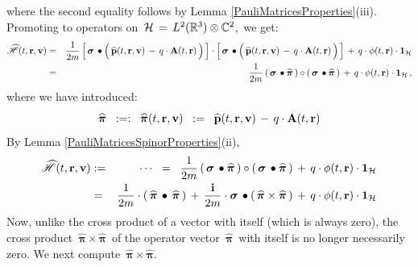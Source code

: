 where the second equality follows by Lemma \ref{PauliMatricesProperties}(iii).
Promoting to operators on \,$\mathcal{H} \,=\, L^{2}(\mathbb{R}^{3}) \otimes \mathbb{C}^{2}$,\, we get:
\begin{eqnarray*}
\widehat{\mathscr{H}}(t, \mathbf{r}, \mathbf{v})
& = &
    \dfrac{1}{2m}
    \left[\,
        \boldsymbol{\sigma}\,\bullet\left(\,
            \widehat{\mathbf{p}}(t,\mathbf{r},\mathbf{v})
            \, \overset{{\color{white}.}}{-} \,
            q\cdot\mathbf{A}(t,\mathbf{r})
            \,\right)
        \,\right]
    \cdot
    \left[\,
        \boldsymbol{\sigma}\,\bullet\left(\,
            \widehat{\mathbf{p}}(t,\mathbf{r},\mathbf{v})
            \, \overset{{\color{white}.}}{-} \,
            q\cdot\mathbf{A}(t,\mathbf{r})
            \,\right)
        \,\right]
    \, + \,
    q\cdot\phi(t,\mathbf{r})\cdot\boldsymbol{1}_{\mathcal{H}}
\\
& = &
    \dfrac{1}{2m}
    \left(\,
        \boldsymbol{\sigma}\,\bullet\boldsymbol{\widehat{\pi}}
        \,\right)
    \circ
    \left(\,
        \boldsymbol{\sigma}\,\bullet\boldsymbol{\widehat{\pi}}
        \,\right)
    \, + \,
    q\cdot\phi(t,\mathbf{r})\cdot\boldsymbol{1}_{\mathcal{H}}\,,
\end{eqnarray*}
where we have introduced:
\begin{equation*}
\boldsymbol{\widehat{\pi}}
\;\; :=: \;\;
    \boldsymbol{\widehat{\pi}}(t, \mathbf{r}, \mathbf{v})
\;\; := \;\;
    \widehat{\mathbf{p}}(t,\mathbf{r},\mathbf{v})
    \, \overset{{\color{white}.}}{-} \,
    q\cdot\mathbf{A}(t,\mathbf{r})
\end{equation*}
By Lemma \ref{PauliMatricesSpinorProperties}(ii),
\begin{eqnarray*}
\widehat{\mathscr{H}}(t, \mathbf{r}, \mathbf{v})
& := &
    \cdots
\;\; = \;\;
    \dfrac{1}{2m}
    \left(\,
        \boldsymbol{\sigma}\,\bullet\boldsymbol{\widehat{\pi}}
        \,\right)
    \circ
    \left(\,
        \boldsymbol{\sigma}\,\bullet\boldsymbol{\widehat{\pi}}
        \,\right)
    \, + \,
    q\cdot\phi(t,\mathbf{r})\cdot\boldsymbol{1}_{\mathcal{H}}
\\
& = &
    \dfrac{1}{2m}\cdot
    \left(\,\boldsymbol{\widehat{\pi}}\,\bullet\,\boldsymbol{\widehat{\pi}}\,\right)
    \, + \,
    \dfrac{\mathbf{i}}{2m}
    \cdot\boldsymbol{\sigma} \,\bullet \left(\,
        \boldsymbol{\widehat{\pi}}
        \times
        \boldsymbol{\widehat{\pi}}
        \,\right)
    \, + \,
    q\cdot\phi(t,\mathbf{r})\cdot\boldsymbol{1}_{\mathcal{H}}
\end{eqnarray*}
Now, unlike the cross product of a vector with itself (which is always zero),
the cross product
\,$\boldsymbol{\widehat{\pi}} \times \boldsymbol{\widehat{\pi}}$\,
of the operator vector
\,$\boldsymbol{\widehat{\pi}}$\,
with itself is no longer necessarily zero.
We next compute 
\,$\boldsymbol{\widehat{\pi}} \times \boldsymbol{\widehat{\pi}}$.\,

